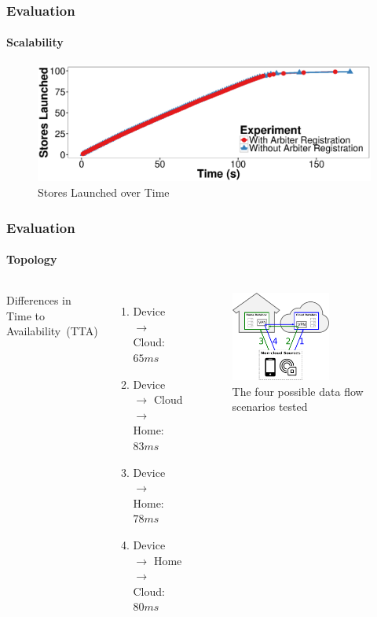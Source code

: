 \documentclass[aspectratio=169]{beamer}
\begin{document}
\begin{frame}
	\frametitle{Evaluation}
	\framesubtitle{Scalability}

	\begin{figure}
		\centering
		\includegraphics[width=\linewidth]{arbiter}
		\caption{Stores Launched over Time}
	\end{figure}
\end{frame}

\begin{frame}
	\frametitle{Evaluation}
	\framesubtitle{Topology}

	\begin{columns}[c]
		Differences in Time to Availability~(TTA)
		\begin{enumerate}
			\item Device $\rightarrow$ Cloud:\\{$65ms$}
			\item Device $\rightarrow$ Cloud $\rightarrow$ Home:\\{$83ms$}
			\item Device $\rightarrow$ Home:\\{$78ms$}
			\item Device $\rightarrow$ Home $\rightarrow$ Cloud:\\{$80ms$}
		\end{enumerate}
		\begin{figure}
			\centering
			\includegraphics[width=0.7\textwidth]{scenarios}
			\caption{The four possible data flow scenarios tested}
		\end{figure}
	\end{columns}
\end{frame}
\end{document}

